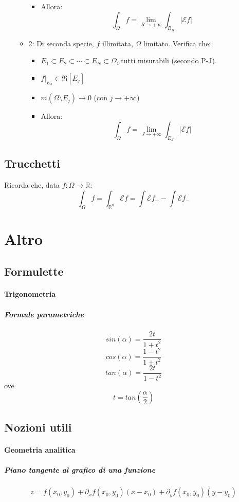 \documentclass[a4paper,12pt]{book}
\begin{document}
\begin{itemize}
\begin{itemize}
\begin{itemize}
   \item Allora: $$\int_\Omega f = \lim_{R \to +\infty} \int_{B_R} |\mathcal{E}f| $$
  \end{itemize}
  \item 2: Di seconda specie, $f$ illimitata, $\Omega$ limitato. Verifica che:
  \begin{itemize}
   \item $E_1 \subset E_2 \subset \cdots \subset E_N \subset \Omega$, tutti misurabili (secondo P-J).
   \item $f|_{E_J} \in \Re[E_j]$
   \item $m(\Omega\setminus E_j) \to 0$ (con $j \to +\infty$)
   \item Allora: $$\int_\Omega f = \lim_{J \to +\infty} \int_{E_J} |\mathcal{E}f|$$
  \end{itemize}
 \end{itemize}
\end{itemize}

\subsection{Trucchetti}
Ricorda che, data $f: \Omega \rightarrow \mathbb{R}$:
 $$\int_\Omega f = \int_{\mathbb{R}^n} \mathcal{E}f = \int \mathcal{E}f_+ - \int \mathcal{E}f_- $$

\section{Altro}
\subsection{Formulette}
\paragraph{Trigonometria}
\subparagraph{Formule parametriche}
$$sin(\alpha) = \frac{2t}{1+t^2}$$
$$cos(\alpha) = \frac{1-t^2}{1+t^2}$$
$$tan(\alpha) = \frac{2t}{1-t^2}$$
ove $$t = tan\left(\frac{\alpha}{2}\right)$$
\subsection{Nozioni utili}
\paragraph{Geometria analitica}
\subparagraph{Piano tangente al grafico di una funzione}
$$z = f(x_0, y_0) + \partial_x f(x_0, y_0) (x-x_0) + \partial_y f(x_0, y_0) (y - y_0) $$
\end{document}

